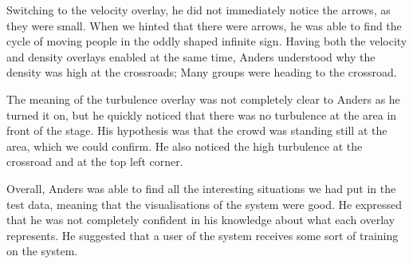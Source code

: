 Switching to the velocity overlay, he did not immediately notice the arrows, as they were small. When we hinted that there were arrows, he was able to find the cycle of moving people in the oddly shaped infinite sign. Having both the velocity and density overlays enabled at the same time, Anders understood why the density was high at the crossroads; Many groups were heading to the crossroad.

The meaning of the turbulence overlay was not completely clear to Anders as he turned it on, but he quickly noticed that there was no turbulence at the area in front of the stage. His hypothesis was that the crowd was standing still at the area, which we could confirm. He also noticed the high turbulence at the crossroad and at the top left corner.

Overall, Anders was able to find all the interesting situations we had put in the test data, meaning that the visualisations of the system were good. He expressed that he was not completely confident in his knowledge about what each overlay represents. He suggested that a user of the system receives some sort of training on the system.







